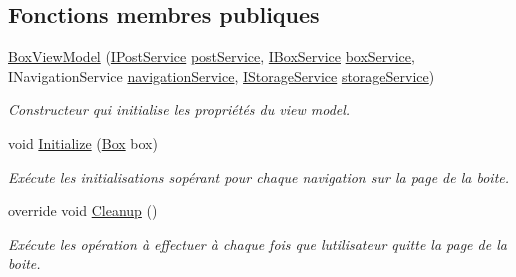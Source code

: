 \subsection*{Fonctions membres publiques}
\begin{DoxyCompactItemize}
\item 
\hyperlink{class_boxes_1_1_view_models_1_1_box_view_model_a36083cc302c227ac7c8230fa8c918f5d}{Box\+View\+Model} (\hyperlink{interface_boxes_1_1_services_1_1_post_1_1_i_post_service}{I\+Post\+Service} \hyperlink{class_boxes_1_1_view_models_1_1_box_view_model_a6f7f5373198c65bb2fcaeb11ddcd9437}{post\+Service}, \hyperlink{interface_boxes_1_1_services_1_1_box_1_1_i_box_service}{I\+Box\+Service} \hyperlink{class_boxes_1_1_view_models_1_1_box_view_model_a41418c9ca1c39ab2ba45e781eb58e038}{box\+Service}, I\+Navigation\+Service \hyperlink{class_boxes_1_1_view_models_1_1_box_view_model_adc660c88b5bfb168d08b5866a298c72c}{navigation\+Service}, \hyperlink{interface_boxes_1_1_services_1_1_storage_1_1_i_storage_service}{I\+Storage\+Service} \hyperlink{class_boxes_1_1_view_models_1_1_box_view_model_a990fdd7bc54aaebe00cc65d77d93360c}{storage\+Service})
\begin{DoxyCompactList}\small\item\em Constructeur qui initialise les propriétés du view model. \end{DoxyCompactList}\item 
void \hyperlink{class_boxes_1_1_view_models_1_1_box_view_model_aa99d3c56acdc985fec5e9d62bb0eadc8}{Initialize} (\hyperlink{class_boxes_1_1_models_1_1_box}{Box} box)
\begin{DoxyCompactList}\small\item\em Exécute les initialisations s\textquotesingle{}opérant pour chaque navigation sur la page de la boite. \end{DoxyCompactList}\item 
override void \hyperlink{class_boxes_1_1_view_models_1_1_box_view_model_a52a3f7f0c465883eb6b69a2eeb9b5138}{Cleanup} ()
\begin{DoxyCompactList}\small\item\em Exécute les opération à effectuer à chaque fois que l\textquotesingle{}utilisateur quitte la page de la boite. \end{DoxyCompactList}\end{DoxyCompactItemize}
